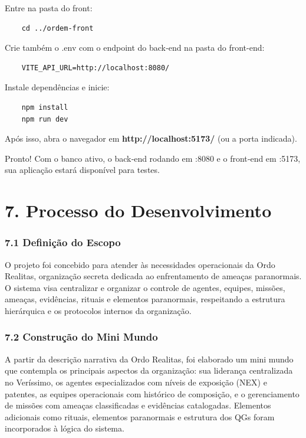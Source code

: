 \documentclass[12pt,a4paper]{report}
\begin{document}
\begin{enumerate}
Entre na pasta do front:
\begin{lstlisting}
    cd ../ordem-front
\end{lstlisting}

Crie também o .env com o endpoint do back‑end na pasta do front-end:

\begin{lstlisting}
    VITE_API_URL=http://localhost:8080/
\end{lstlisting}

Instale dependências e inicie:

\begin{lstlisting}
    npm install
    npm run dev
\end{lstlisting}

Após isso, abra o navegador em \textbf{http://localhost:5173/} (ou a porta indicada).

Pronto! Com o banco ativo, o back‑end rodando em :8080 e o front‑end em :5173, sua aplicação estará disponível para testes.

\end{enumerate}
    
\chapter{7. Processo do Desenvolvimento}

\subsection{7.1 Definição do Escopo}

O projeto foi concebido para atender às necessidades operacionais da Ordo Realitas, organização secreta dedicada ao enfrentamento de ameaças paranormais. O sistema visa centralizar e organizar o controle de agentes, equipes, missões, ameaças, evidências, rituais e elementos paranormais, respeitando a estrutura hierárquica e os protocolos internos da organização.

\subsection{7.2 Construção do Mini Mundo}

A partir da descrição narrativa da Ordo Realitas, foi elaborado um mini mundo que contempla os principais aspectos da organização: sua liderança centralizada no Veríssimo, os agentes especializados com níveis de exposição (NEX) e patentes, as equipes operacionais com histórico de composição, e o gerenciamento de missões com ameaças classificadas e evidências catalogadas. Elementos adicionais como rituais, elementos paranormais e estrutura dos QGs foram incorporados à lógica do sistema.
\end{document}
